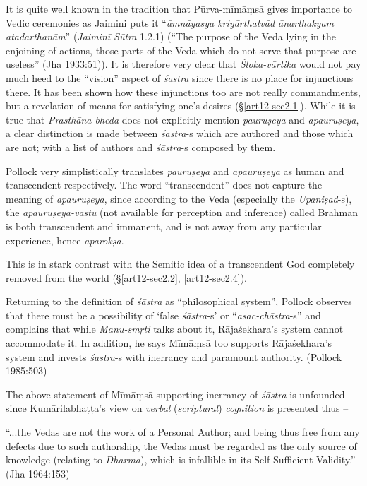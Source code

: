 It is quite well known in the tradition that Pūrva-mīmāṃsā gives importance to Vedic ceremonies as Jaimini puts it ``{\sl āmnāyasya kriyārthatvād ānarthakyam atadarthanām}'' ({\sl Jaiminī Sūtra} 1.2.1) (``The purpose of the Veda lying in the enjoining of actions, those parts of the Veda which do not serve that purpose are useless'' (Jha 1933:51)). It is therefore very clear that {\sl Śloka-vārtika} would not pay much heed to the ``vision'' aspect of {\sl śāstra} since there is no place for injunctions there. It has been shown how these injunctions too are not really commandments, but a revelation of means for satisfying one's desires (\S\ref{art12-sec2.1}). While it is true that {\sl Prasthāna-bheda} does not explicitly mention {\sl pauruṣeya} and {\sl apauruṣeya}, a clear distinction is made between {\sl śāstra}-s which are authored and those which are not; with a list of authors and {\sl śāstra}-s composed by them. 

Pollock very simplistically translates {\sl pauruṣeya} and {\sl apauruṣeya}  as human and transcendent respectively. The word ``transcendent'' does not capture the meaning of {\sl apauruṣeya}, since according to the Veda (especially the {\sl Upaniṣad}-s), the {\sl apauruṣeya-vastu} (not available for perception and inference) called Brahman is both transcendent and immanent, and is not away from any particular experience, hence {\sl aparokṣa}.

This is in stark contrast with the Semitic idea of a transcendent God completely removed from the world (\S\ref{art12-sec2.2}, \ref{art12-sec2.4}). 

Returning to the deﬁnition of {\sl śāstra} as ``philosophical system'', Pollock observes that there must be a possibility of `false {\sl śāstra}-s' or ``{\sl asac-chāstra}-s'' and complains that while {\sl Manu-smṛti} talks about it, Rājaśekhara's system cannot accommodate it. In addition, he says Mīmāṃsā too supports Rājaśekhara's system and invests {\sl śāstra}-s with inerrancy and paramount authority. (Pollock 1985:503)

The above statement of Mīmāṃsā supporting inerrancy of {\sl śāstra} is unfounded since Kumārilabhaṭṭa's view on {\sl verbal} ({\sl scriptural}) {\sl cognition} is presented thus --
\begin{myquote}
“...the Vedas are not the work of a Personal Author; and being thus free from any defects due to such authorship, the Vedas must be regarded as the only source of knowledge (relating to {\sl Dharma}), which is infallible in its Self-Sufficient Validity.'' (Jha 1964:153)
\end{myquote}

